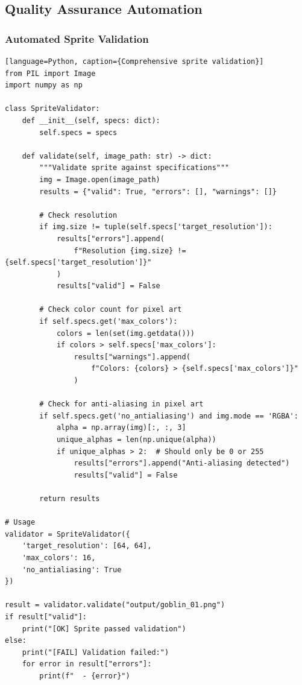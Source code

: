 \documentclass[11pt]{article}
\begin{document}
\subsection{Quality Assurance Automation}

\subsubsection{Automated Sprite Validation}

\begin{verbatim}[language=Python, caption={Comprehensive sprite validation}]
from PIL import Image
import numpy as np

class SpriteValidator:
    def __init__(self, specs: dict):
        self.specs = specs

    def validate(self, image_path: str) -> dict:
        """Validate sprite against specifications"""
        img = Image.open(image_path)
        results = {"valid": True, "errors": [], "warnings": []}

        # Check resolution
        if img.size != tuple(self.specs['target_resolution']):
            results["errors"].append(
                f"Resolution {img.size} != {self.specs['target_resolution']}"
            )
            results["valid"] = False

        # Check color count for pixel art
        if self.specs.get('max_colors'):
            colors = len(set(img.getdata()))
            if colors > self.specs['max_colors']:
                results["warnings"].append(
                    f"Colors: {colors} > {self.specs['max_colors']}"
                )

        # Check for anti-aliasing in pixel art
        if self.specs.get('no_antialiasing') and img.mode == 'RGBA':
            alpha = np.array(img)[:, :, 3]
            unique_alphas = len(np.unique(alpha))
            if unique_alphas > 2:  # Should only be 0 or 255
                results["errors"].append("Anti-aliasing detected")
                results["valid"] = False

        return results

# Usage
validator = SpriteValidator({
    'target_resolution': [64, 64],
    'max_colors': 16,
    'no_antialiasing': True
})

result = validator.validate("output/goblin_01.png")
if result["valid"]:
    print("[OK] Sprite passed validation")
else:
    print("[FAIL] Validation failed:")
    for error in result["errors"]:
        print(f"  - {error}")
\end{verbatim}
\end{document}

